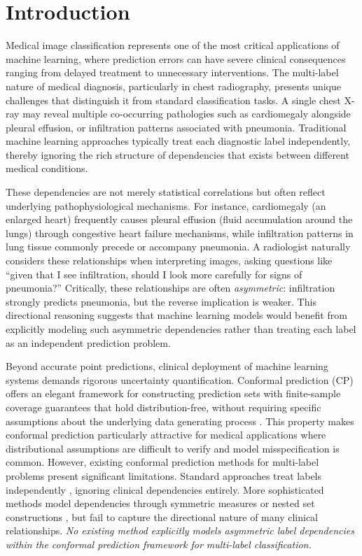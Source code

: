\section{Introduction}
\label{sec:introduction}

Medical image classification represents one of the most critical applications of machine learning, where prediction errors can have severe clinical consequences ranging from delayed treatment to unnecessary interventions.
The multi-label nature of medical diagnosis, particularly in chest radiography, presents unique challenges that distinguish it from standard classification tasks.
A single chest X-ray may reveal multiple co-occurring pathologies such as cardiomegaly alongside pleural effusion, or infiltration patterns associated with pneumonia.
Traditional machine learning approaches typically treat each diagnostic label independently, thereby ignoring the rich structure of dependencies that exists between different medical conditions.

These dependencies are not merely statistical correlations but often reflect underlying pathophysiological mechanisms.
For instance, cardiomegaly (an enlarged heart) frequently causes pleural effusion (fluid accumulation around the lungs) through congestive heart failure mechanisms, while infiltration patterns in lung tissue commonly precede or accompany pneumonia.
A radiologist naturally considers these relationships when interpreting images, asking questions like ``given that I see infiltration, should I look more carefully for signs of pneumonia?''
Critically, these relationships are often \emph{asymmetric}: infiltration strongly predicts pneumonia, but the reverse implication is weaker.
This directional reasoning suggests that machine learning models would benefit from explicitly modeling such asymmetric dependencies rather than treating each label as an independent prediction problem.

Beyond accurate point predictions, clinical deployment of machine learning systems demands rigorous uncertainty quantification.
Conformal prediction (CP) offers an elegant framework for constructing prediction sets with finite-sample coverage guarantees that hold distribution-free, without requiring specific assumptions about the underlying data generating process \citep{vovk2005algorithmic}.
This property makes conformal prediction particularly attractive for medical applications where distributional assumptions are difficult to verify and model misspecification is common.
However, existing conformal prediction methods for multi-label problems present significant limitations.
Standard approaches treat labels independently \citep{angelopoulos2020uncertainty}, ignoring clinical dependencies entirely.
More sophisticated methods model dependencies through symmetric measures \citep{messoudi2021copula} or nested set constructions \citep{cauchois2021knowing}, but fail to capture the directional nature of many clinical relationships.
\emph{No existing method explicitly models asymmetric label dependencies within the conformal prediction framework for multi-label classification.}

